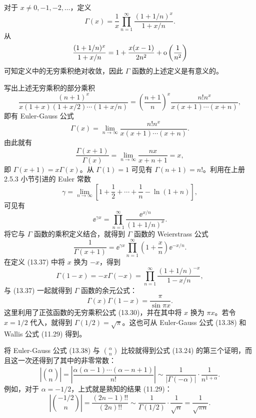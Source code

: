 \begin{xexample}[13.4.4]
对于 $x\neq0,-1,-2,\ldots$，定义
\begin{equation}
\Gamma(x)=\frac1x\prod_{n=1}^{\infty}\frac{(1+1/n)^x}{1+x/n}.
\tag{13.37}
\end{equation}
从
\[
\frac{(1+1/n)^x}{1+x/n}=1+\frac{x(x-1)}{2n^2}+\mathrm{o}\left(\frac1{n^2}\right)
\]
可知定义中的无穷乘积绝对收敛，因此 $\Gamma$ 函数的上述定义是有意义的。

写出上述无穷乘积的部分乘积
\[
\frac{(n+1)^x}{x(1+x)(1+x/2)\cdots(1+x/n)}
=\left(\frac{n+1}{n}\right)^x\frac{n!n^x}{x(x+1)\cdots(x+n)},
\]
即有 Euler-Gauss 公式
\begin{equation}
\Gamma(x)=\lim_{n\to\infty}\frac{n!n^x}{x(x+1)\cdots(x+n)}.
\tag{13.38}
\end{equation}
由此就有
\[
\frac{\Gamma(x+1)}{\Gamma(x)}=\lim_{n\to\infty}\frac{nx}{x+n+1}=x,
\]
即 $\Gamma(x+1)=x\Gamma(x)$。从 $\Gamma(1)=1$ 可见有 $\Gamma(n+1)=n!$。利用在上册 2.5.3 小节引进的 Euler 常数
\[
\gamma=\lim_{n\to\infty}\left[1+\frac12+\cdots+\frac1n-\ln(1+n)\right],
\]
可见有
\[
\ee^{\gamma x}=\prod_{n=1}^{\infty}\frac{\ee^{x/n}}{(1+1/n)^x}.
\]
将它与 $\Gamma$ 函数的乘积定义结合，就得到 $\Gamma$ 函数的 Weierstrass 公式
\begin{equation}
\frac1{\Gamma(x+1)}=\ee^{\gamma x}\prod_{n=1}^{\infty}\left(1+\frac xn\right)\ee^{-x/n}.
\tag{13.39}
\end{equation}
在定义 (13.37) 中将 $x$ 换为 $-x$，得到
\[
\Gamma(1-x)=-x\Gamma(-x)=\prod_{n=1}^{\infty}\frac{(1+1/n)^{-x}}{1-x/n},
\]
与 (13.37) 一起就得到 $\Gamma$ 函数的余元公式：
\begin{equation}
\Gamma(x)\Gamma(1-x)=\frac\pi{\sin\pi x}.
\tag{13.40}
\end{equation}
这里利用了正弦函数的无穷乘积公式 (13.30)，并在其中将 $x$ 换为 $\pi x$。若令 $x=1/2$ 代入，就得到 $\Gamma(1/2)=\sqrt\pi$。这也可从 Euler-Gauss 公式 (13.38) 和 Wallis 公式 (11.29) 得到。
\end{xexample}

\begin{xremark}
将 Euler-Gauss 公式 (13.38) 与 $\binom{\alpha}{n}$ 比较就得到公式 (13.24) 的第三个证明，而且这一次还得到了其中的非零常数：
\begin{equation}
\left|\binom{\alpha}{n}\right|=\left|\frac{\alpha(\alpha-1)\cdots(\alpha-n+1)}{n!}\right|\sim\frac1{|\Gamma(-\alpha)|}\cdot\frac1{n^{1+\alpha}}.
\tag{13.41}
\end{equation}
例如，对于 $\alpha=-1/2$，上式就是熟知的结果 (11.29)：
\[
\left|\binom{-1/2}{n}\right|=\frac{(2n-1)!!}{(2n)!!}\sim\frac1{\Gamma(1/2)}\cdot\frac1{\sqrt n}=\frac1{\sqrt{\pi n}}.
\]
\end{xremark}

